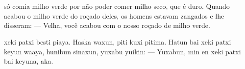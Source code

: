 \chapter*{}

\mbox{}\vspace*{\fill}



 só comia milho
verde por não poder comer
milho seco, que é duro.
Quando acabou o milho verde
do roçado deles, os homens
estavam zangados
e lhe disseram:\break
--- Velha, você acabou com o
nosso roçado de milho verde.

\vspace{2em}

 xeki patxi besti piaya.
Haska waxun, piti kuxi pitima.
Hatun bai xeki patxi keyun waaya,
hunibun sinaxun, yuxabu yuikin:\break
--- Yuxabun, min en xeki
patxi bai keyuna, aka.

\vspace*{\fill}

